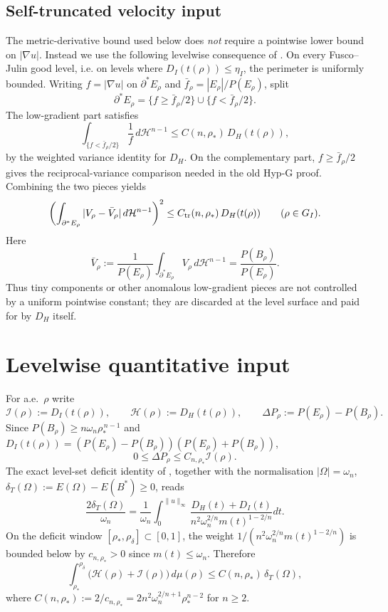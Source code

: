\documentclass[11pt]{article}
\theoremstyle{definition}
\newcommand{\Om}{\Omega}
\newcommand{\rstar}{\rho_{*}}
\begin{document}
\subsection{Self-truncated velocity input}\label{ssec:trimmed-velocity}

The metric-derivative bound used below does \emph{not} require a
pointwise lower bound on $|\nabla u|$.  Instead we use the following
levelwise consequence of \cite{TrimmedVelocityRepair}.  On every
Fusco--Julin good level, i.e. on levels where
$D_I(t(\rho))\le\eta_I$, the perimeter is uniformly bounded.  Writing
$f=|\nabla u|$ on $\partial^*E_\rho$ and
$\bar f_\rho=|E_\rho|/P(E_\rho)$, split
\[
   \partial^*E_\rho
   =\{f\ge \bar f_\rho/2\}\cup\{f<\bar f_\rho/2\}.
\]
The low-gradient part satisfies
\[
   \int_{\{f<\bar f_\rho/2\}}\frac1f\,d\mathcal H^{n-1}
   \le C(n,\rstar)\,D_H(t(\rho)),
\]
by the weighted variance identity for $D_H$.  On the complementary part,
$f\ge\bar f_\rho/2$ gives the reciprocal-variance comparison needed in
the old Hyp-G proof.  Combining the two pieces yields
\begin{equation}\label{eq:self-truncated-V}
   \biggl(\int_{\partial^*E_\rho}|V_\rho-\bar V_\rho|\,
     d\mathcal H^{n-1}\biggr)^2
   \le C_{\rm tr}(n,\rstar)\,D_H(t(\rho))
   \qquad(\rho\in G_I).
\end{equation}
Here
\[
   \bar V_\rho:=\frac{1}{P(E_\rho)}
       \int_{\partial^*E_\rho}V_\rho\,d\mathcal H^{n-1}
       =\frac{P(B_\rho)}{P(E_\rho)}.
\]
Thus tiny components or other anomalous low-gradient pieces are not
controlled by a uniform pointwise constant; they are discarded at the
level surface and paid for by $D_H$ itself.

\section{Levelwise quantitative input}\label{sec:FJ}

For a.e.\ $\rho$ write
\[
   \mathcal I(\rho):=D_I(t(\rho)),\qquad
   \mathcal H(\rho):=D_H(t(\rho)),\qquad
   \Delta P_\rho:=P(E_\rho)-P(B_\rho).
\]
Since $P(B_\rho)\ge n\omega_n\rstar^{\,n-1}$ and
$D_I(t(\rho))=(P(E_\rho)-P(B_\rho))(P(E_\rho)+P(B_\rho))$,
\begin{equation}\label{eq:DP-DI}
   0\le \Delta P_\rho\le C_{n,\rstar}\mathcal I(\rho).
\end{equation}
The exact level-set deficit identity of
\cite[Eq.~(eq:main), Thm.~5.1]{LevelSetIdentity}, together with the
normalisation $|\Om|=\omega_n$,
$\delta_T(\Om):=E(\Om)-E(B^*)\ge 0$, reads
\[
   \frac{2\delta_T(\Om)}{\omega_n}
   =\frac{1}{\omega_n}\int_{0}^{\|u\|_\infty}
   \frac{D_H(t)+D_I(t)}{n^2\omega_n^{2/n}m(t)^{1-2/n}}dt.
\]
On the deficit window $[\rstar,\rho_\delta]\subset[0,1]$, the weight
$1/(n^2\omega_n^{2/n}m(t)^{1-2/n})$ is bounded below by
$c_{n,\rstar}>0$ since $m(t)\le \omega_n$.  Therefore
\begin{equation}\label{eq:DH-DI-int}
   \int_{\rstar}^{\rho_\delta}\bigl(\mathcal H(\rho)+\mathcal I(\rho)\bigr)\,
   d\mu(\rho)\le C(n,\rstar)\,\delta_T(\Om),
\end{equation}
where $C(n,\rstar):=2/c_{n,\rstar}=2n^2\omega_n^{2/n+1}\rstar^{n-2}$ for
$n\ge 2$.
\end{document}
